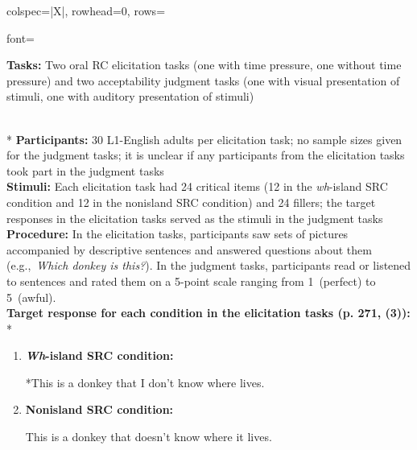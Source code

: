 \begin{longtblr}[caption={\textcite{ferreira.swets2005}: Oral elicitation tasks and acceptability judgment tasks}, label={tblr:ferreira}]{colspec={|X|}, rowhead=0, rows={font=\raggedright{}}}\hline
\textbf{Tasks:} Two oral RC elicitation tasks (one with time pressure, one without time pressure) and two acceptability judgment tasks (one with visual presentation of stimuli, one with auditory presentation of stimuli) \vspace{5pt}\rule{0pt}{10pt}\\*
\textbf{Participants:} 30 L1-English adults per elicitation task; no sample sizes given for the judgment tasks; it is unclear if any participants from the elicitation tasks took part in the judgment tasks \vspace{5pt}\\
\textbf{Stimuli:} Each elicitation task had 24 critical items (12 in the \textit{wh}-island SRC condition and 12 in the nonisland SRC condition) and 24 fillers; the target responses in the elicitation tasks served as the stimuli in the judgment tasks \vspace{5pt}\\
\textbf{Procedure:} In the elicitation tasks, participants saw sets of pictures accompanied by descriptive sentences and answered questions about them (e.g.,~\textit{Which donkey is this?}). In the judgment tasks, participants read or listened to sentences and rated them on a 5-point scale ranging from 1~(perfect) to 5~(awful). \vspace{5pt}\\
\textbf{Target response for each condition in the elicitation tasks (p. 271, (3)):} \vspace{5pt}\\*

\begin{varwidth}{\linewidth}\begin{enumerate}[\bfseries (a),itemsep=5pt] 
\item \textbf{\textit{Wh}-island SRC condition:}\par\nobreak
*This is a donkey that I don't know where  lives.
\item \textbf{Nonisland SRC condition:}\par\nobreak
\phantom{*}This is a donkey that \boxing{\_\_} doesn't know where it lives.
\end{enumerate}\end{varwidth}\\\hline
\end{longtblr}

